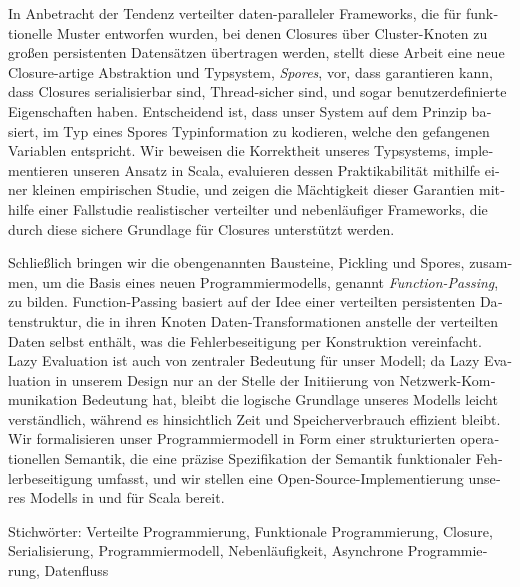 \begin{otherlanguage}{german}
\vspace{0.2cm}

In Anbetracht der Tendenz verteilter daten-paralleler Frameworks, die für
funktionelle Muster entworfen wurden, bei denen Closures über Cluster-Knoten zu
großen persistenten Datensätzen übertragen werden, stellt diese Arbeit eine neue
Closure-artige Abstraktion und Typsystem, {\em Spores}, vor, dass garantieren
kann, dass Closures serialisierbar sind, Thread-sicher sind, und sogar
benutzerdefinierte Eigenschaften haben. Entscheidend ist, dass unser System auf
dem Prinzip basiert, im Typ eines Spores Typinformation zu kodieren, welche den
gefangenen Variablen entspricht. Wir beweisen die Korrektheit unseres
Typsystems, implementieren unseren Ansatz in Scala, evaluieren dessen
Praktikabilität mithilfe einer kleinen empirischen Studie, und zeigen die
Mächtigkeit dieser Garantien mithilfe einer Fallstudie realistischer verteilter
und nebenläufiger Frameworks, die durch diese sichere Grundlage für Closures
unterstützt werden.

\vspace{0.2cm}

Schließlich bringen wir die obengenannten Bausteine, Pickling und Spores,
zusammen, um die Basis eines neuen Programmiermodells, genannt  {\em
Function-Passing}, zu bilden. Function-Passing basiert auf der Idee einer
verteilten persistenten Datenstruktur, die in ihren Knoten
Daten-Transformationen anstelle der verteilten Daten selbst enthält, was die
Fehlerbeseitigung per Konstruktion vereinfacht. Lazy Evaluation ist auch von
zentraler Bedeutung für unser Modell; da Lazy Evaluation in unserem Design nur
an der Stelle der Initiierung von Netzwerk-Kommunikation Bedeutung hat, bleibt
die logische Grundlage unseres Modells leicht verständlich, während es
hinsichtlich Zeit und Speicherverbrauch effizient bleibt. Wir formalisieren
unser Programmiermodell in Form einer strukturierten operationellen Semantik,
die eine präzise Spezifikation der Semantik funktionaler Fehlerbeseitigung
umfasst, und wir stellen eine Open-Source-Implementierung unseres Modells in und
für Scala bereit.




\vskip0.5cm

Stichwörter: Verteilte Programmierung, Funktionale Programmierung, Closure,
Serialisierung, Programmiermodell, Nebenläufigkeit, Asynchrone Programmierung,
Datenfluss
\end{otherlanguage}



